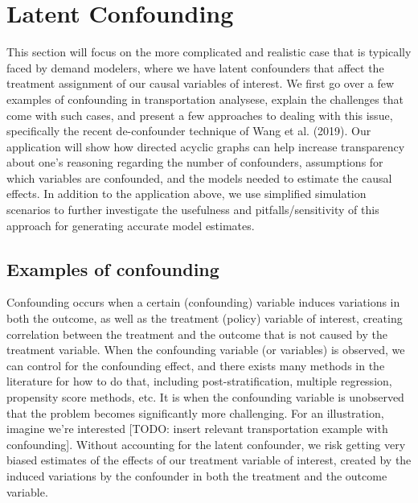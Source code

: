 \section{Latent Confounding}

This section will focus on the more complicated and realistic case that is typically faced by demand modelers, where we have latent confounders that affect the treatment assignment of our causal variables of interest. We first go over a few examples of confounding in transportation analysese, explain the challenges that come with such cases, and present a few approaches to dealing with this issue, specifically the recent de-confounder technique of Wang et al. (2019). Our application will show how directed acyclic graphs can help increase transparency about one's reasoning regarding the number of confounders, assumptions for which variables are confounded, and the models needed to estimate the causal effects. In addition to the application above, we use simplified simulation scenarios to further investigate the usefulness and pitfalls/sensitivity of this approach for generating accurate model estimates. 

\subsection{Examples of confounding}

Confounding occurs when a certain (confounding) variable induces variations in both the outcome, as well as the treatment (policy) variable of interest, creating correlation between the treatment and the outcome that is not caused by the treatment variable. When the confounding variable (or variables) is observed, we can control for the confounding effect, and there exists many methods in the literature for how to do that, including post-stratification, multiple regression, propensity score methods, etc. It is when the confounding variable is unobserved that the problem becomes significantly more challenging. For an illustration, imagine we're interested [TODO: insert relevant transportation example with confounding]. Without accounting for the latent confounder, we risk getting very biased estimates of the effects of our treatment variable of interest, created by the induced variations by the confounder in both the treatment and the outcome variable. 


